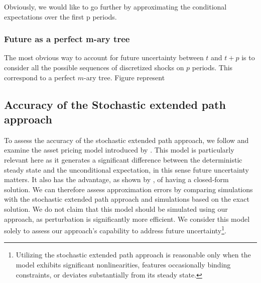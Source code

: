 \documentclass[a4paper,12pt]{amsart}
\begin{document}
Obviously, we would like to go further by approximating the
conditional expectations over the first p periods.\newline

\subsubsection{Future as a perfect m-ary tree} The most obvious way to
account for future uncertainty between $t$ and $t+p$ is to consider all the possible
sequences of discretized shocks on $p$ periods. This correspond to a perfect $m$-ary tree. Figure
represent


\subsection{Accuracy of the Stochastic extended path approach}

To assess the accuracy of the stochastic extended path approach, we
follow \textcite{CollardJuillard2001} and
examine the asset pricing model introduced by
\textcite{Burnside1998}. This model is particularly relevant here as
it generates a significant difference between the deterministic steady
state and the unconditional expectation, in this sense future uncertainty
matters. It also has the advantage, as shown by
\textcite{Burnside1998}, of having a closed-form solution. We can
therefore assess approximation errors by comparing simulations with
the stochastic extended path approach and simulations based on the
exact solution. We do not claim that this model should be simulated
using our approach, as perturbation is significantly more
efficient. We consider this model solely to assess our approach's
capability to address future uncertainty\footnote{Utilizing the
   stochastic extended path approach is reasonable only when the model
   exhibits significant nonlinearities, features occasionally binding
   constraints, or deviates substantially from its steady
   state.}.\newline
\end{document}
